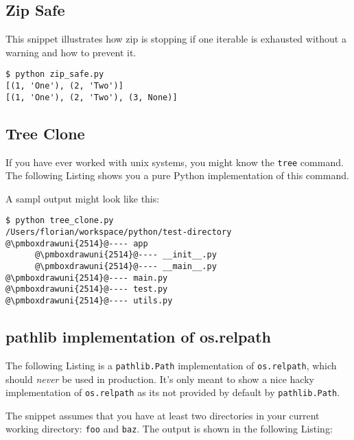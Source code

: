 \subsection{Zip Safe}

This snippet illustrates how zip is stopping if one iterable is exhausted without a warning and how to prevent it.



\begin{lstlisting}[caption=Output of zip\_safe.py]
$ python zip_safe.py
[(1, 'One'), (2, 'Two')]
[(1, 'One'), (2, 'Two'), (3, None)]
\end{lstlisting}


\subsection{Tree Clone}

If you have ever worked with unix systems, you might know the \lstinline{tree} command.
The following Listing shows you a pure Python implementation of this command.



A sampl output might look like this:

\begin{lstlisting}[caption=Output of tree\_clone.py,escapechar=@]
$ python tree_clone.py
/Users/florian/workspace/python/test-directory
@\pmboxdrawuni{2514}@---- app
      @\pmboxdrawuni{2514}@---- __init__.py
      @\pmboxdrawuni{2514}@---- __main__.py
@\pmboxdrawuni{2514}@---- main.py
@\pmboxdrawuni{2514}@---- test.py
@\pmboxdrawuni{2514}@---- utils.py
\end{lstlisting}


\subsection{pathlib implementation of os.relpath}

The following Listing is a \lstinline{pathlib.Path} implementation of \lstinline{os.relpath}, which should \textit{never} be used in production.
It's only meant to show a nice hacky implementation of \lstinline{os.relpath} as its not provided by default by \lstinline{pathlib.Path}.



The snippet assumes that you have at least two directories in your current working directory: \lstinline{foo} and \lstinline{baz}.
The output is shown in the following Listing:


